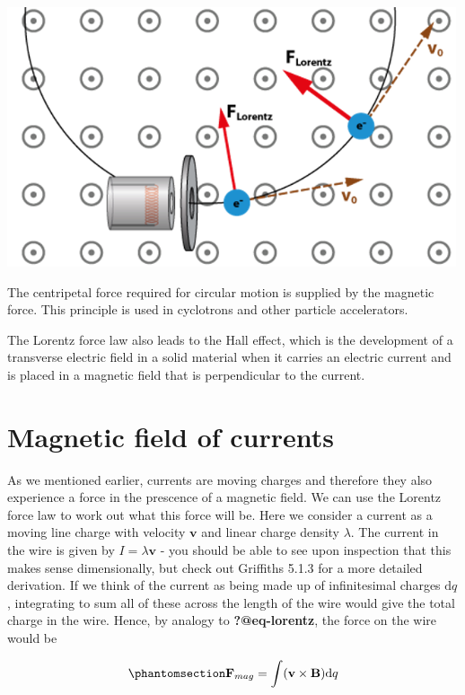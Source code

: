 \documentclass[
  letterpaper,
  DIV=11,
  numbers=noendperiod]{scrreprt}
\begin{document}
\includegraphics[width=5.20833in,height=\textheight]{Figures/lorentz_motion.png}

The centripetal force required for circular motion is supplied by the
magnetic force. This principle is used in cyclotrons and other particle
accelerators.

The Lorentz force law also leads to the Hall effect, which is the
development of a transverse electric field in a solid material when it
carries an electric current and is placed in a magnetic field that is
perpendicular to the current.

\section{Magnetic field of currents}\label{magnetic-field-of-currents}

As we mentioned earlier, currents are moving charges and therefore they
also experience a force in the prescence of a magnetic field. We can use
the Lorentz force law to work out what this force will be. Here we
consider a current as a moving line charge with velocity
\(\mathrm{\mathbf{v}}\) and linear charge density \(\lambda\). The
current in the wire is given by \(I = \lambda \mathrm{\mathbf{v}}\) -
you should be able to see upon inspection that this makes sense
dimensionally, but check out Griffiths 5.1.3 for a more detailed
derivation. If we think of the current as being made up of infinitesimal
charges \(\mathrm{d} q\), integrating to sum all of these across the
length of the wire would give the total charge in the wire. Hence, by
analogy to \textbf{?@eq-lorentz}, the force on the wire would be

\begin{equation}\phantomsection\label{eq-currentforce}{ \mathrm{\mathbf{F}}_{mag} = \int (\mathrm{\mathbf{v}}\times \mathrm{\mathbf{B}}) \mathrm{d} q }\end{equation}
\end{document}
